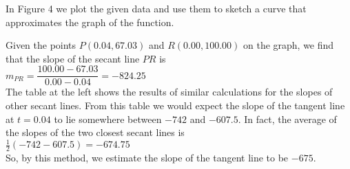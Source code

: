 \documentclass{sebase}
\begin{document}
\begin{Solution}
In Figure 4 we plot the given data and use them to sketch a curve that
approximates the graph of the function.\\[8pt]
\hspace*{\fill}\hspace*{\fill}%
\pagebreak
\end{Solution}

Given the points $P(0.04,67.03)$ and $R(0.00,100.00)$ on the graph, we find
that the slope of the secant line $PR$ is\\[5pt]
\hspace*{\fill}$m_{PR}=\dfrac{100.00-67.03}{0.00-0.04}=-824.25$\hspace*{\fill%
}\\[5pt]
The table at the left shows the results of similar
calculations for the slopes of other secant lines. From this table we would
expect the slope of the tangent line at $t=0.04$ to lie somewhere between $%
-742$ and $-607.5$. In fact, the average of the slopes of the two closest
secant lines is\\[8pt]
\hspace*{\fill}$\tfrac{1}{2}(-742-607.5)=-674.75$\hspace*{\fill}\\[8pt]
So, by this method, we estimate the slope of the tangent line to be $-675$.
\end{document}

